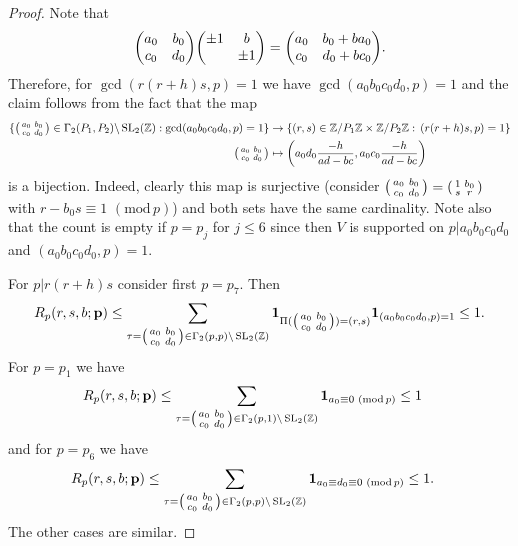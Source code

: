 \documentclass[12pt]{amsart}
\theoremstyle{definition}
\theoremstyle{remark}
\numberwithin{equation}{section}
\newcommand{\Z}{{\mathbb Z}}
\newcommand{\1}{{\mathbf 1}}
\newcommand{\SL}{\operatorname{SL}_2}
\renewcommand{\c}{\mathfrak c}
\renewcommand{\pmod}[1]{\,\,(\mathrm{mod}\,{#1})}
\begin{document}
\begin{proof}
    Note that
    \begin{align*}
        \mqty(a_0 & b_0 \\c_0 & d_0)\mqty(\pm 1 & b \\ & \pm 1) =   \mqty(a_0 & b_0 +b a_0 \\c_0 & d_0 + b c_0).
    \end{align*}
    Therefore, for $\gcd(r(r+h)s,p)=1$ we have $\gcd(a_0b_0c_0d_0,p)=1$  and the claim follows from the fact that the map
    \begin{align*}
       \{ \smqty(a_0 & b_0 \\ c_0 & d_0) \in \Gamma_2(P_1,P_2) \backslash \SL(\Z): \gcd(a_0b_0c_0d_0,p)=1 \} &\to \{(r,s) \in \Z/P_1\Z \times \Z/P_2\Z : \, (r(r+h)s,p)=1\} \\
       \smqty(a_0 & b_0 \\ c_0 & d_0) &\mapsto  \bigg(a_0d_0 \frac{-h}{ad-bc},a_0c_0 \frac{-h}{ad-bc}\bigg)
   \end{align*}
  is a bijection. Indeed, clearly this map is surjective (consider $\smqty(a_0 & b_0 \\ c_0 & d_0) = \smqty(1 & b_0 \\ s & r) $ with $r-b_0 s  \equiv 1 \pmod{p}$) and both sets have the same cardinality. Note also that the count is empty if $p=p_j$ for $j \leq 6$ since then $V$ is supported on $p| a_0b_0c_0d_0$ and $(a_0b_0c_0d_0,p)=1$.

  For  $p|r(r+h)s$ consider first $p=p_7$. Then
  \begin{align*}
      R_p(r,s,b;\mathbf{p})  \leq  \sum_{\tau= \smqty(a_0 & b_0 \\ c_0 & d_0) \in \Gamma_2(p,p) \backslash \SL(\Z)} \mathbf{1}_{\Pi(\smqty(a_0 & b_0 \\ c_0 & d_0))=(r,s)}\mathbf{1}_{(a_0b_0c_0d_0,p)=1}  \leq 1.
  \end{align*}
  For $p=p_1$ we have
  \begin{align*}
      R_p(r,s,b;\mathbf{p})  &\leq  \sum_{\tau= \smqty(a_0 & b_0 \\ c_0 & d_0) \in \Gamma_2(p,1) \backslash \SL(\Z)}  \mathbf{1}_{a_0  \equiv 0 \pmod{p}} \leq 1
  \end{align*}
and for $p=p_6$  we have
  \begin{align*}
      R_p(r,s,b;\mathbf{p})  &\leq  \sum_{\tau= \smqty(a_0 & b_0 \\ c_0 & d_0) \in \Gamma_2(p,p) \backslash \SL(\Z)}  \mathbf{1}_{a_0 \equiv d_0 \equiv 0 \pmod{p}}    \leq 1.
  \end{align*}
The other cases are similar.
\end{proof}
\end{document}
